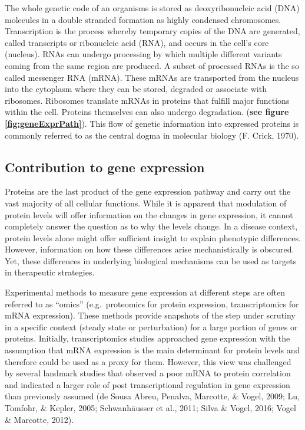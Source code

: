 \documentclass[
  12pt,
  openany]{book}
\begin{document}
The whole genetic code of an organisms is stored as deoxyribonucleic acid (DNA) molecules in a double stranded formation as highly condensed chromosomes. Transcription is the process whereby temporary copies of the DNA are generated, called transcripts or ribonucleic acid (RNA), and occurs in the cell's core (nucleus). RNAs can undergo processing by which multiple different variants coming from the same region are produced. A subset of processed RNAs is the so called messenger RNA (mRNA). These mRNAs are transported from the nucleus into the cytoplasm where they can be stored, degraded or associate with ribosomes. Ribosomes translate mRNAs in proteins that fulfill major functions within the cell. Proteins themselves can also undergo degradation. (\textbf{see figure \ref{fig:geneExprPath}}). This flow of genetic information into expressed proteins is commonly referred to as the central dogma in molecular biology (F. Crick, 1970).
\clearpage

\subsection{Contribution to gene expression}

Proteins are the last product of the gene expression pathway and carry out the vast majority of all cellular functions. While it is apparent that modulation of protein levels will offer information on the changes in gene expression, it cannot completely answer the question as to why the levels change. In a disease context, protein levels alone might offer sufficient insight to explain phenotypic differences. However, information on how these differences arise mechanistically is obscured. Yet, these differences in underlying biological mechanisms can be used as targets in therapeutic strategies.

Experimental methods to measure gene expression at different steps are often referred to as ``omics'' (e.g.~proteomics for protein expression, transcriptomics for mRNA expression). These methods provide snapshots of the step under scrutiny in a specific context (steady state or perturbation) for a large portion of genes or proteins. Initially, transcriptomics studies approached gene expression with the assumption that mRNA expression is the main determinant for protein levels and therefore could be used as a proxy for them. However, this view was challenged by several landmark studies that observed a poor mRNA to protein correlation and indicated a larger role of post transcriptional regulation in gene expression than previously assumed (de Sousa Abreu, Penalva, Marcotte, \& Vogel, 2009; Lu, Tomfohr, \& Kepler, 2005; Schwanhäusser et al., 2011; Silva \& Vogel, 2016; Vogel \& Marcotte, 2012).
\end{document}
